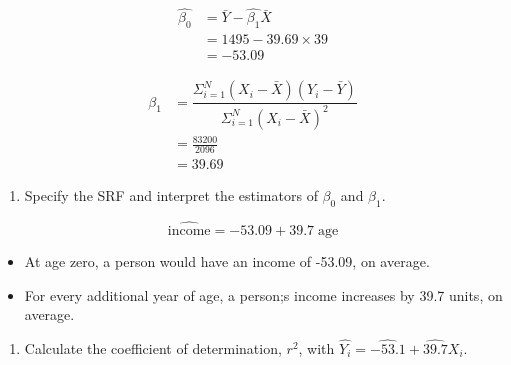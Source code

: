 \documentclass[12pt,a4paper]{article}
\providecommand{\tightlist}{%
  \setlength{\itemsep}{0pt}\setlength{\parskip}{0pt}}
\begin{document}
\begin{align*}\label{eq:beta1est}
\hat{\beta_{0}} &=  \bar{Y} - \hat{\beta_{1}}\bar{X} \\[0.25ex]
                &= 1495 - 39.69 \times 39 \\
                &= -53.09
\end{align*}

\begin{align*}
\hat{\beta_{1}} &= \dfrac{\Sigma_{i=1}^{N} (X_{i}-\bar{X})(Y_{i}-\bar{Y})}{\Sigma_{i=1}^{N} (X_{i} - \bar{X})^{2}} \\[0.25ex]
                &= \frac{83200}{2096} \\
                &= 39.69
\end{align*}

\begin{enumerate}
\def\labelenumi{\arabic{enumi}.}
\setcounter{enumi}{1}
\tightlist
\item
  Specify the SRF and interpret the estimators of \(\beta_{0}\) and
  \(\beta_{1}\).
\end{enumerate}

\begin{equation*}
\widehat{\text{income}} = -53.09 + 39.7 \; \text{age}
\end{equation*}

\begin{itemize}
\tightlist
\item
  At age zero, a person would have an income of -53.09, on average.
\item
  For every additional year of age, a person;s income increases by 39.7
  units, on average.
\end{itemize}

\vspace{1.5cm}

\begin{enumerate}
\def\labelenumi{\arabic{enumi}.}
\setcounter{enumi}{2}
\tightlist
\item
  Calculate the coefficient of determination, \(r^{2}\), with
  \(\hat{Y_{i}}= \widehat{-53.1} + \widehat{39.7} X_{i}\).
\end{enumerate}

\FloatBarrier
\begingroup
\centering
\fontsize{11}{11}\selectfont
\setlength{\tabcolsep}{6pt}
\end{document}
